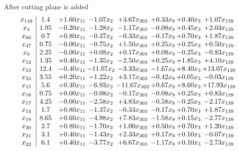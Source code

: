 \documentclass[8pt]{article}
\begin{document}
 After cutting plane is added 
\[\begin{array}{c| c c@{\hskip 2pt} c@{\hskip 2pt} c@{\hskip 2pt} c@{\hskip 2pt} c@{\hskip 2pt} c@{\hskip 2pt} }
 x_{149}   &  1.4 & +  1.60 x_{11} & -1.07 x_{2} & +  3.67 x_{303} & +  0.33 x_{9} & +  0.40 x_{3} & +  1.07 x_{139}\\
 x_{4}   &  1.95 & -0.20 x_{11} & -1.28 x_{2} & -1.17 x_{303} & -0.08 x_{9} & +  0.45 x_{3} & +  2.03 x_{139}\\
 x_{80}   &  0.7 & +  0.80 x_{11} & -0.37 x_{2} & -0.33 x_{303} & -0.17 x_{9} & +  0.70 x_{3} & +  1.87 x_{139}\\
 x_{47}   &  0.75 & -0.00 x_{11} & -0.75 x_{2} & +  1.50 x_{303} & +  0.25 x_{9} & +  0.25 x_{3} & +  0.50 x_{139}\\
 x_{6}   &  2.25 & -0.00 x_{11} & +  0.08 x_{2} & +  0.17 x_{303} & +  0.08 x_{9} & -0.25 x_{3} & -0.83 x_{139}\\
 x_{12}   &  1.35 & +  0.40 x_{11} & -1.35 x_{2} & -2.50 x_{303} & +  0.25 x_{9} & +  1.85 x_{3} & +  4.10 x_{139}\\
 x_{13}   &  12.4 & -0.40 x_{11} & -11.07 x_{2} & -3.33 x_{303} & -1.67 x_{9} & +  8.40 x_{3} & + 13.07 x_{139}\\
 x_{33}   &  3.55 & +  0.20 x_{11} & -1.22 x_{2} & +  3.17 x_{303} & -0.42 x_{9} & +  0.05 x_{3} & -0.03 x_{139}\\
 x_{15}   &  5.6 & +  0.40 x_{11} & -6.93 x_{2} & -11.67 x_{303} & +  0.67 x_{9} & +  8.60 x_{3} & + 17.93 x_{139}\\
 x_{16}   &  0.75 & +  0.00 x_{11} & -0.08 x_{2} & -0.17 x_{303} & -0.08 x_{9} & +  0.25 x_{3} & +  0.83 x_{139}\\
 x_{17}   &  4.25 & -0.00 x_{11} & -2.58 x_{2} & +  4.83 x_{303} & -0.58 x_{9} & -0.25 x_{3} & -2.17 x_{139}\\
 x_{14}   &  1.7 & +  0.80 x_{11} & -1.37 x_{2} & -0.33 x_{303} & -0.17 x_{9} & +  0.70 x_{3} & +  1.87 x_{139}\\
 x_{19}   &  8.65 & +  0.60 x_{11} & -4.98 x_{2} & +  7.83 x_{303} & -1.58 x_{9} & +  0.15 x_{3} & -2.77 x_{139}\\
 x_{20}   &  2.7 & +  0.80 x_{11} & -1.70 x_{2} & +  1.00 x_{303} & +  0.50 x_{9} & +  0.70 x_{3} & +  1.20 x_{139}\\
 x_{21}   &  3.1 & +  0.40 x_{11} & -1.43 x_{2} & +  2.33 x_{303} & +  0.17 x_{9} & +  0.10 x_{3} & -0.07 x_{139}\\
 x_{22}   &  6.1 & +  0.40 x_{11} & -3.77 x_{2} & +  6.67 x_{303} & -1.17 x_{9} & +  0.10 x_{3} & -2.73 x_{139}\\

\end{array}\]
\end{document}
